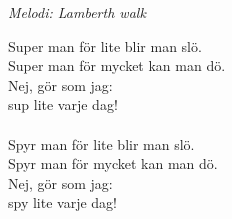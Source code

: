 {\footnotesize\textit{Melodi: Lamberth walk}}\par
\vspace{10pt}
Super man för lite blir man slö.\\
Super man för mycket kan man dö.\\
Nej, gör som jag:\\
sup lite varje dag!\\
\\
Spyr man för lite blir man slö.\\
Spyr man för mycket kan man dö.\\
Nej, gör som jag:\\
spy lite varje dag!
